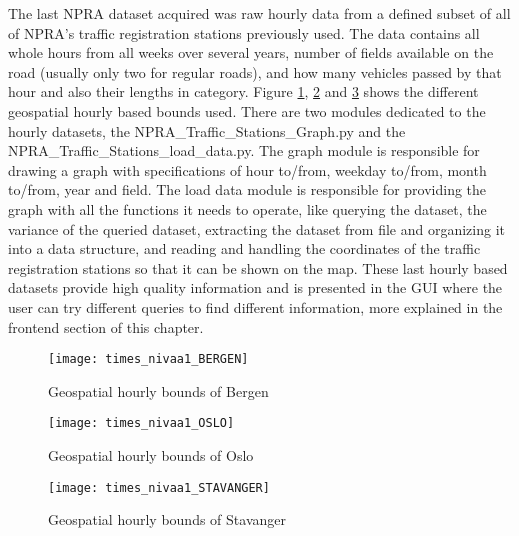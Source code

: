 The last NPRA dataset acquired was raw hourly data from a defined subset of all of NPRA's traffic registration stations previously used. The data contains all whole hours from all weeks over several years, number of fields available on the road (usually only two for regular roads), and how many vehicles passed by that hour and also their lengths in category. Figure \ref{fig:hboundsbergen}, \ref{fig:hboundsoslo} and \ref{fig:hboundsstavanger} shows the different geospatial hourly based bounds used. There are two modules dedicated to the hourly datasets, the NPRA\_Traffic\_Stations\_Graph.py and the NPRA\_Traffic\_Stations\_load\_data.py. The graph module is responsible for drawing a graph with specifications of hour to/from, weekday to/from, month to/from, year and field. The load data module is responsible for providing the graph with all the functions it needs to operate, like querying the dataset, the variance of the queried dataset, extracting the dataset from file and organizing it into a data structure, and reading and handling the coordinates of the traffic registration stations so that it can be shown on the map. These last hourly based datasets provide high quality information and is presented in the GUI where the user can try different queries to find different information, more explained in the frontend section of this chapter.

\begin{figure}[ht]
\texttt{[image: times\_nivaa1\_BERGEN]}
\centering
\caption{Geospatial hourly bounds of Bergen}
\label{fig:hboundsbergen}
\end{figure}

\begin{figure}[ht]
\texttt{[image: times\_nivaa1\_OSLO]}
\centering
\caption{Geospatial hourly bounds of Oslo}
\label{fig:hboundsoslo}
\end{figure}

\begin{figure}[ht]
\texttt{[image: times\_nivaa1\_STAVANGER]}
\centering
\caption{Geospatial hourly bounds of Stavanger}
\label{fig:hboundsstavanger}
\end{figure}






